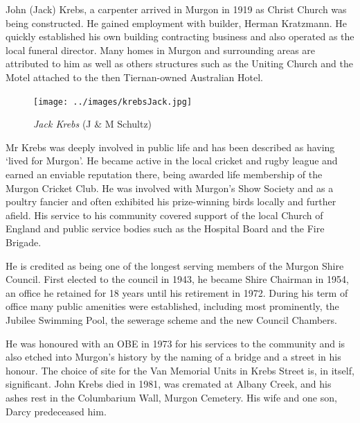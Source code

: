 John (Jack) Krebs, a carpenter arrived in Murgon in 1919 as Christ Church was being constructed. He gained employment with builder, Herman Kratzmann. He quickly established his own building contracting business and also operated as the local funeral director. Many homes in Murgon and surrounding areas are attributed to him as well as others structures such as the Uniting Church and the Motel attached to the then Tiernan-owned Australian Hotel.









\begin{figure}
\begin{center}
\texttt{[image: ../images/krebsJack.jpg]}
\caption{{\itshape Jack Krebs} {\scriptsize(J \& M Schultz)}}
\end{center}
\end{figure}




Mr Krebs was deeply involved in public life and has been described as having `lived for Murgon'. He became active in the local cricket and rugby league and earned an enviable reputation there, being awarded life membership of the Murgon Cricket Club. He was involved with Murgon's Show Society and as a poultry fancier and often exhibited his prize-winning birds locally and further afield. His service to his community covered support of the local Church of England and public service bodies such as the Hospital Board and the Fire Brigade.



He is credited as being one of the longest serving members of the Murgon Shire Council. First elected to the council in 1943, he became Shire Chairman in 1954, an office he retained for 18 years until his retirement in 1972. During his term of office many public amenities were established, including most prominently, the Jubilee Swimming Pool, the sewerage scheme and the new Council Chambers.



He was honoured with an OBE in 1973 for his services to the community and is also etched into Murgon's history by the naming of a bridge and a street in his honour. The choice of site for the Van Memorial Units in Krebs Street is, in itself, significant. John Krebs died in 1981, was cremated at Albany Creek, and his ashes rest in the Columbarium Wall, Murgon Cemetery. His wife and one son, Darcy predeceased him.



